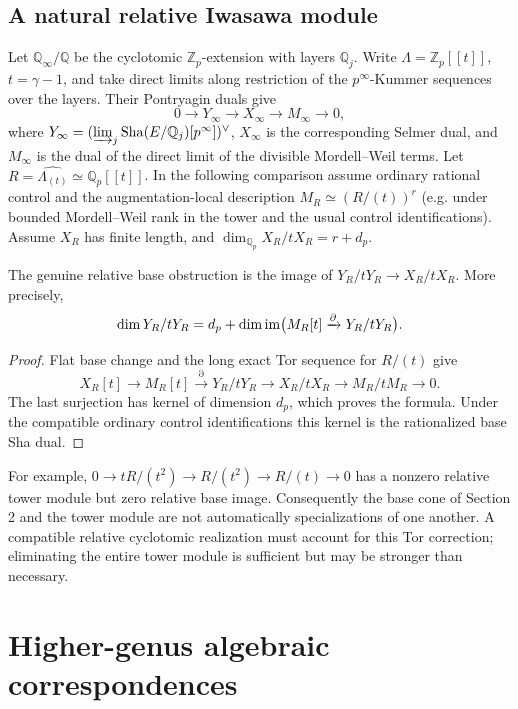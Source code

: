 \documentclass[11pt,a4paper]{article}
\newcommand{\Zp}{\mathbb Z_p}\newcommand{\Qp}{\mathbb Q_p}\newcommand{\Q}{\mathbb Q}\newcommand{\Sha}{\mathop{\mathrm{\mathit{\mathstrut Ш}}}} %
\renewcommand{\Sha}{\operatorname{Sha}}
\begin{document}
\subsection{A natural relative Iwasawa module}
Let $\Q_\infty/\Q$ be the cyclotomic $\Zp$-extension with layers $\Q_j$. Write $\Lambda=\Zp[[t]]$, $t=\gamma-1$, and take direct limits along restriction of the $p^\infty$-Kummer sequences over the layers. Their Pontryagin duals give
\[
0\to Y_\infty\to X_\infty\to M_\infty\to0,
\]
where $Y_\infty=(\varinjlim_j\Sha(E/\Q_j)[p^\infty])^\vee$, $X_\infty$ is the corresponding Selmer dual, and $M_\infty$ is the dual of the direct limit of the divisible Mordell--Weil terms. Let $R=\widehat{\Lambda_{(t)}}\simeq\Qp[[t]]$. In the following comparison assume ordinary rational control and the augmentation-local description $M_R\simeq(R/(t))^r$ (e.g. under bounded Mordell--Weil rank in the tower and the usual control identifications). Assume $X_R$ has finite length, and $\dim_{\Qp}X_R/tX_R=r+d_p$.
\begin{proposition}\label{prop:spec}
The genuine relative base obstruction is the image of $Y_R/tY_R\to X_R/tX_R$. More precisely,
\begin{equation}\label{eq:defect}
\dim Y_R/tY_R=d_p+\dim\operatorname{im}\bigl(M_R[t]\xrightarrow{\partial}Y_R/tY_R\bigr).
\end{equation}
\end{proposition}
\begin{proof}
Flat base change and the long exact Tor sequence for $R/(t)$ give
\[
X_R[t]\to M_R[t]\xrightarrow{\partial}Y_R/tY_R\to X_R/tX_R\to M_R/tM_R\to0.
\]
The last surjection has kernel of dimension $d_p$, which proves the formula. Under the compatible ordinary control identifications this kernel is the rationalized base Sha dual.
\end{proof}
For example, $0\to tR/(t^2)\to R/(t^2)\to R/(t)\to0$ has a nonzero relative tower module but zero relative base image. Consequently the base cone of Section 2 and the tower module are not automatically specializations of one another. A compatible relative cyclotomic realization must account for this Tor correction; eliminating the entire tower module is sufficient but may be stronger than necessary.
\newpage
\section{Higher-genus algebraic correspondences}
\end{document}
